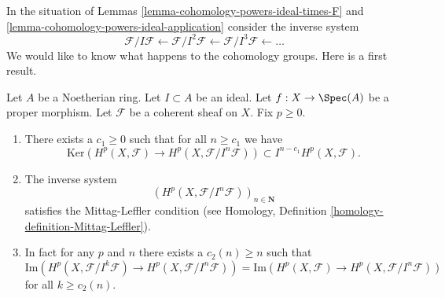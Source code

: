 \noindent
In the situation of Lemmas \ref{lemma-cohomology-powers-ideal-times-F} and
\ref{lemma-cohomology-powers-ideal-application} consider the inverse
system
$$
\mathcal{F}/I\mathcal{F} \leftarrow
\mathcal{F}/I^2\mathcal{F} \leftarrow
\mathcal{F}/I^3\mathcal{F} \leftarrow \ldots
$$
We would like to know what happens to the cohomology groups.
Here is a first result.

\begin{lemma}
\label{lemma-ML-cohomology-powers-ideal}
Let $A$ be a Noetherian ring.
Let $I \subset A$ be an ideal.
Let $f : X \to \Spec(A)$ be a proper morphism.
Let $\mathcal{F}$ be a coherent sheaf on $X$.
Fix $p \geq 0$.
\begin{enumerate}
\item There exists a $c_1 \geq 0$ such that for all $n \geq c_1$
we have
$$
\text{Ker}(
H^p(X, \mathcal{F}) \to H^p(X, \mathcal{F}/I^n\mathcal{F})
)
\subset
I^{n - c_1}H^p(X, \mathcal{F}).
$$
\item The inverse system
$$
\left(H^p(X, \mathcal{F}/I^n\mathcal{F})\right)_{n \in \mathbf{N}}
$$
satisfies the Mittag-Leffler condition (see
Homology, Definition \ref{homology-definition-Mittag-Leffler}).
\item In fact for any $p$ and $n$ there exists a $c_2(n) \geq n$
such that
$$
\text{Im}(H^p(X, \mathcal{F}/I^k\mathcal{F})
\to H^p(X, \mathcal{F}/I^n\mathcal{F}))
=
\text{Im}(H^p(X, \mathcal{F})
\to H^p(X, \mathcal{F}/I^n\mathcal{F}))
$$
for all $k \geq c_2(n)$.
\end{enumerate}
\end{lemma}

